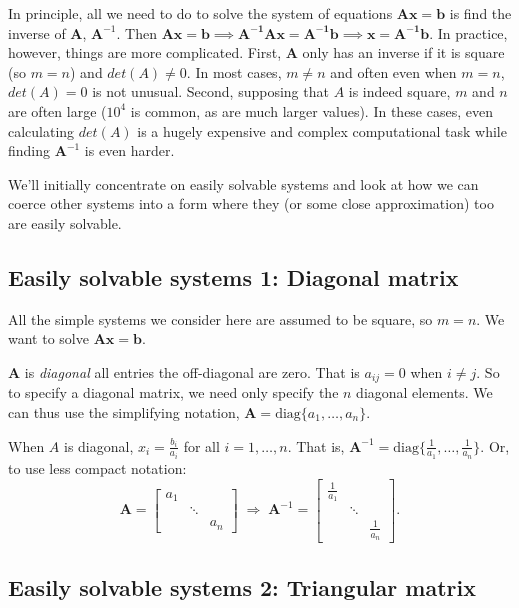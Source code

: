 In principle, all we need to do to solve the system of equations $\mathbf {Ax} = \mathbf b$ is find the inverse of $\mathbf A$, $\mathbf A^{-1}$.  Then $ \mathbf {Ax} = \mathbf b \implies \mathbf {A^{-1}Ax}  = \mathbf {A^{-1}b}  \implies \mathbf x = \mathbf  {A^{-1}b}$.  In practice, however, things are more complicated.  First, $\mathbf A$ only has an inverse if it is square (so $m = n$) and $det(A) \ne 0$.  In most cases, $m \ne n$ and often even when $m = n$,  $det(A) = 0$ is not unusual.  Second, supposing that $A$ is indeed square, $m$ and $n$ are often large ($10^4$ is common, as are much larger values).  In these cases, even calculating $det(A)$ is a hugely expensive and complex computational task while finding $\mathbf A^{-1}$ is even harder.

We'll initially concentrate on easily solvable systems and look at how we can coerce other systems into a form where they (or some close approximation) too are easily solvable. 

\subsection{Easily solvable systems 1: Diagonal matrix}

All the simple systems we consider here are assumed to be square, so $m = n$.  We want to solve $\mathbf {Ax} =\mathbf b$.

$\mathbf A$ is {\em diagonal} all entries the off-diagonal are zero.  That is $a_{ij} = 0$ when $i \ne j$.   So to specify a diagonal matrix, we need only specify the $n$ diagonal elements.  We can thus use the simplifying notation, $\mathbf{A}=\mathrm{diag}\{a_1,\ldots,a_n\}$.

When $A$ is diagonal, $x_i = \frac{b_i}{a_i}$ for all $i=1,\ldots, n$.  That is, $\mathbf A^{-1} = \mathrm{diag}\{\frac 1 {a_1},
\ldots, \frac1 {a_n} \}$. Or, to use less compact notation:
\[
\mathbf{A} = \left[       
\begin{array}{lll}
 a_{1}  & & \\ & \ddots & \\ & & a_n
\end{array}
\right] \; \Rightarrow \; \mathbf{A}^{-1} = \left[       
\begin{array}{lll}
 \frac{1}{a_{1}} & &\\ & \ddots & \\ & & \frac{1}{a_n}
\end{array}
 \right].
\]

\subsection{Easily solvable systems 2: Triangular matrix}


